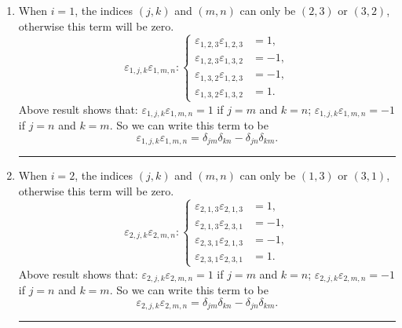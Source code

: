 \documentclass[12pt]{article}
\begin{document}
\begin{enumerate}

\item When $i=1$, the indices $(j,k)$ and $(m,n)$ can only be $(2,3)$ or $(3,2)$, otherwise this term will be zero.
\begin{equation}
\varepsilon_{1,j,k}\varepsilon_{1,m,n} : \begin{cases}
\varepsilon_{1,2,3}\varepsilon_{1,2,3}&=1,\\
\varepsilon_{1,2,3}\varepsilon_{1,3,2}&=-1,\\
\varepsilon_{1,3,2}\varepsilon_{1,2,3}&=-1,\\
\varepsilon_{1,3,2}\varepsilon_{1,3,2}&=1.
\end{cases}
\end{equation}
Above result shows that: $\varepsilon_{1,j,k}\varepsilon_{1,m,n}=1$ if $j=m$ and $k=n$; $\varepsilon_{1,j,k}\varepsilon_{1,m,n}=-1$ if $j=n$ and $k=m$. So we can write this term to be 
\begin{equation}
\varepsilon_{1,j,k}\varepsilon_{1,m,n} = \delta_{jm}\delta_{kn} - \delta_{jn}\delta_{km}.
\end{equation}
\hrule

\item When $i=2$, the indices $(j,k)$ and $(m,n)$ can only be $(1,3)$ or $(3,1)$, otherwise this term will be zero.
\begin{equation}
\varepsilon_{2,j,k}\varepsilon_{2,m,n} : \begin{cases}
\varepsilon_{2,1,3}\varepsilon_{2,1,3}&=1,\\
\varepsilon_{2,1,3}\varepsilon_{2,3,1}&=-1,\\
\varepsilon_{2,3,1}\varepsilon_{2,1,3}&=-1,\\
\varepsilon_{2,3,1}\varepsilon_{2,3,1}&=1.
\end{cases}
\end{equation}
Above result shows that: $\varepsilon_{2,j,k}\varepsilon_{2,m,n}=1$ if $j=m$ and $k=n$; $\varepsilon_{2,j,k}\varepsilon_{2,m,n}=-1$ if $j=n$ and $k=m$. So we can write this term to be 
\begin{equation}
\varepsilon_{2,j,k}\varepsilon_{2,m,n} = \delta_{jm}\delta_{kn} - \delta_{jn}\delta_{km}.
\end{equation}
\hrule


\end{enumerate}
\end{document}
